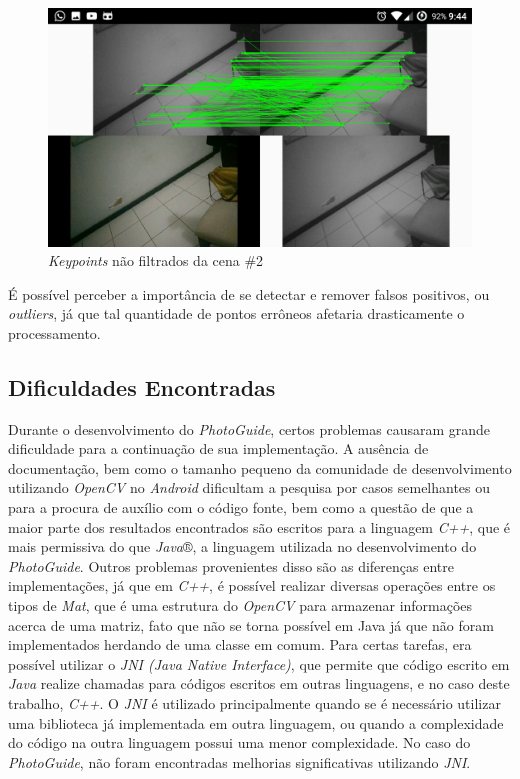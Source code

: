 \begin{figure}[!htb]
	\centering
		\includegraphics[width= \textwidth]{Imagens/figura3-11.png}
	\caption{\textit{Keypoints} não filtrados da cena \#2}
	\label{fig3:11}
\end{figure}


É possível perceber a importância de se detectar e remover falsos positivos, ou \textit{outliers}, já que tal quantidade de pontos errôneos afetaria drasticamente o processamento.

\subsection{Dificuldades Encontradas}

Durante o desenvolvimento do \textit{PhotoGuide}, certos problemas causaram grande dificuldade para a continuação de sua implementação. A ausência de documentação, bem como o tamanho pequeno da comunidade de desenvolvimento utilizando \textit{OpenCV} no \textit{Android} dificultam a pesquisa por casos semelhantes ou para a procura de auxílio com o código fonte, bem como a questão de que a maior parte dos resultados encontrados são escritos para a linguagem \textit{C++}, que é mais permissiva do que \textit{Java}®, a linguagem utilizada no desenvolvimento do \textit{PhotoGuide}. Outros problemas provenientes disso são as diferenças entre implementações, já que em \textit{C++}, é possível realizar diversas operações entre os tipos de \textit{Mat},  que é uma estrutura do \textit{OpenCV} para armazenar informações acerca de uma matriz, fato que não se torna possível em Java já que não foram implementados herdando de uma classe em comum. Para certas tarefas, era possível utilizar o \textit{JNI (Java Native Interface)}\cite{JNI}, que permite que código escrito em \textit{Java }realize chamadas para códigos escritos em outras linguagens, e no caso deste trabalho, \textit{C++}. O \textit{JNI} é utilizado principalmente quando se é necessário utilizar uma biblioteca já implementada em outra linguagem, ou quando a complexidade do código na outra linguagem possui uma menor complexidade. No caso do \textit{PhotoGuide}, não foram encontradas melhorias significativas utilizando \textit{JNI}. 

